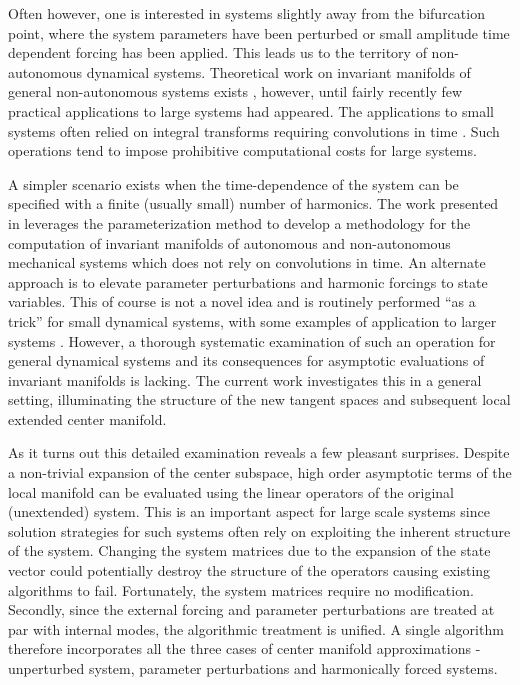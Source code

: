 Often however, one is interested in systems slightly away from the bifurcation point, where the system parameters have been perturbed or small amplitude time dependent forcing has been applied. This leads us to the territory of non-autonomous dynamical systems. Theoretical work on invariant manifolds of general non-autonomous systems exists \citep{chicone97,siegmund02,hochs19,roberts22}, however, until fairly recently few practical applications to large systems had appeared. The applications to small systems often relied on integral transforms requiring convolutions in time \citep{cox91,siegmund02,roberts22}. Such operations tend to impose prohibitive computational costs for large systems. 

A simpler scenario exists when the time-dependence of the system can be specified with a finite (usually small) number of harmonics. The work presented in \cite{jain22,vizzaccaro22,thurnher24} leverages the parameterization method to develop a methodology for the computation of invariant manifolds of autonomous and non-autonomous mechanical systems which does not rely on convolutions in time. 
An alternate approach is to elevate parameter perturbations and harmonic forcings to state variables. This of course is not a novel idea and is routinely performed ``as a trick'' for small dynamical systems, with some examples of application to larger systems \citep{mercer90,cox91,jiang91,negi24,vizzaccaro24}. 
However, a thorough systematic examination of such an operation for general dynamical systems and its consequences for asymptotic evaluations of invariant manifolds is lacking. The current work investigates this in a general setting, illuminating the structure of the new tangent spaces and subsequent local extended center manifold. 

As it turns out this detailed examination reveals a few pleasant surprises. Despite a non-trivial expansion of the center subspace, high order asymptotic terms of the local manifold can be evaluated using the linear operators of the original (unextended) system. This is an important aspect for large scale systems since solution strategies for such systems often rely on exploiting the inherent structure of the system. Changing the system matrices due to the expansion of the state vector could potentially destroy the structure of the operators causing existing algorithms to fail. Fortunately, the system matrices require no modification. Secondly, since the external forcing and parameter perturbations are treated at par with internal modes, the algorithmic treatment is unified. A single algorithm therefore incorporates all the three cases of center manifold approximations - unperturbed system, parameter perturbations and harmonically forced systems. 

